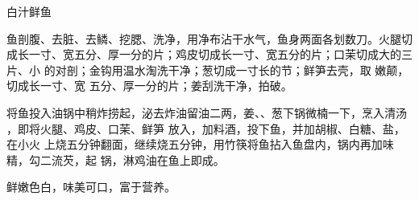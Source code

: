 \begin{recipe}{白汁鲜鱼}

\ingredients


\preparation

\step 鱼剖腹、去脏、去鳞、挖腮、洗净，用净布沾干水气，鱼身两面各划数刀。火腿切
成长一寸、宽五分、厚一分的片；鸡皮切成长一寸、宽五分的片；口茉切成大的三片、小
的对剖；金钩用温水淘洗干净；葱切成一寸长的节；鲜笋去壳，取 嫩颠，切成长一寸、宽
五分、厚一分的片；姜刮洗干净，拍破。

\step 将鱼投入油锅中稍炸捞起，泌去炸油留油二两，姜、、葱下锅微楠一下，烹入清汤
，即将火腿、鸡皮、口茉、鲜笋 放入，加料酒，投下鱼，并加胡椒、白糖、盐，在小火
上烧五分钟翻面，继续烧五分钟，用竹筷将鱼拈入鱼盘内，锅内再加味精，勾二流芡，起
锅，淋鸡油在鱼上即成。

\features

鲜嫩色白，味美可口，富于营养。

\end{recipe}

